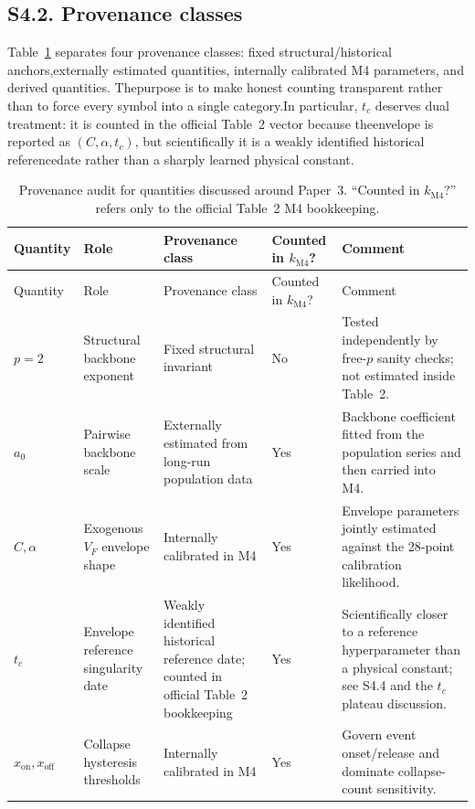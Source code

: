 \documentclass[11pt]{article}
\begin{document}
\subsection*{S4.2. Provenance classes}\label{subsec:S4_provenance_classes}
Table~\ref{tab:S4_provenance} separates four provenance classes: fixed structural/historical anchors,externally estimated quantities, internally calibrated M4 parameters, and derived quantities. Thepurpose is to make honest counting transparent rather than to force every symbol into a single category.In particular, $t_c$ deserves dual treatment: it is counted in the official Table~2 vector because theenvelope is reported as $(C,\alpha,t_c)$, but scientifically it is a weakly identified historical referencedate rather than a sharply learned physical constant.\begin{center}\begin{longtable}{>{\raggedright\arraybackslash}p{2.1cm} >{\raggedright\arraybackslash}p{3.0cm} >{\raggedright\arraybackslash}p{3.4cm} >{\centering\arraybackslash}p{1.4cm} >{\raggedright\arraybackslash}p{4.1cm}}\caption{Provenance audit for quantities discussed around Paper~3. ``Counted in $k_{\mathrm{M4}}$?'' refers only to the official Table~2 M4 bookkeeping.}\label{tab:S4_provenance}\\\toprule
Quantity & Role & Provenance class & Counted in $k_{\mathrm{M4}}$? & Comment\\\midrule
\endfirsthead
\toprule
Quantity & Role & Provenance class & Counted in $k_{\mathrm{M4}}$? & Comment\\\midrule\endhead
$p=2$ & Structural backbone exponent & Fixed structural invariant & No & Tested independently by free-$p$ sanity checks; not estimated inside Table~2.\\
$a_0$ & Pairwise backbone scale & Externally estimated from long-run population data & Yes & Backbone coefficient fitted from the population series and then carried into M4.\\
$C,\alpha$ & Exogenous $V_F$ envelope shape & Internally calibrated in M4 & Yes & Envelope parameters jointly estimated against the 28-point calibration likelihood.\\
$t_c$ & Envelope reference singularity date & Weakly identified historical reference date; counted in official Table~2 bookkeeping & Yes & Scientifically closer to a reference hyperparameter than a physical constant; see S4.4 and the $t_c$ plateau discussion.\\
$x_{\mathrm{on}},x_{\mathrm{off}}$ & Collapse hysteresis thresholds & Internally calibrated in M4 & Yes & Govern event onset/release and dominate collapse-count sensitivity.\\

\end{longtable}
\end{center}
\end{document}
